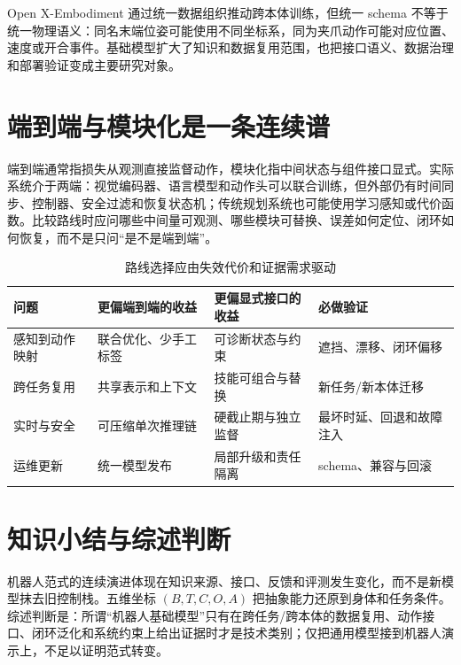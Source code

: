 Open X-Embodiment 通过统一数据组织推动跨本体训练\cite{openx2024}，但统一 schema 不等于统一物理语义：同名末端位姿可能使用不同坐标系，同为夹爪动作可能对应位置、速度或开合事件。基础模型扩大了知识和数据复用范围，也把接口语义、数据治理和部署验证变成主要研究对象。

\section{端到端与模块化是一条连续谱}

端到端通常指损失从观测直接监督动作，模块化指中间状态与组件接口显式。实际系统介于两端：视觉编码器、语言模型和动作头可以联合训练，但外部仍有时间同步、控制器、安全过滤和恢复状态机；传统规划系统也可能使用学习感知或代价函数。比较路线时应问哪些中间量可观测、哪些模块可替换、误差如何定位、闭环如何恢复，而不是只问“是不是端到端”。

\begin{table}[H]
\begingroup
{}
\centering
\caption{路线选择应由失效代价和证据需求驱动}
\label{tab:end-to-end-modular-tradeoff}
\begin{tabularx}{\textwidth}{p{}YYY}
\toprule
问题 & 更偏端到端的收益 & 更偏显式接口的收益 & 必做验证 \\
\midrule
感知到动作映射 & 联合优化、少手工标签 & 可诊断状态与约束 & 遮挡、漂移、闭环偏移 \\
跨任务复用 & 共享表示和上下文 & 技能可组合与替换 & 新任务/新本体迁移 \\
实时与安全 & 可压缩单次推理链 & 硬截止期与独立监督 & 最坏时延、回退和故障注入 \\
运维更新 & 统一模型发布 & 局部升级和责任隔离 & schema、兼容与回滚 \\
\bottomrule
\end{tabularx}
\endgroup
\end{table}

\section{知识小结与综述判断}

机器人范式的连续演进体现在知识来源、接口、反馈和评测发生变化，而不是新模型抹去旧控制栈。五维坐标 $(B,T,C,O,A)$ 把抽象能力还原到身体和任务条件。综述判断是：所谓“机器人基础模型”只有在跨任务/跨本体的数据复用、动作接口、闭环泛化和系统约束上给出证据时才是技术类别；仅把通用模型接到机器人演示上，不足以证明范式转变。
